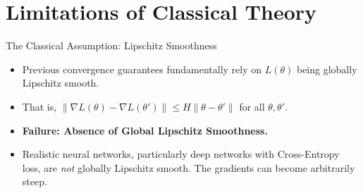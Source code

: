\documentclass[10pt, aspectratio=169]{beamer}
\theoremstyle{definition}
\begin{document}

\section{Limitations of Classical Theory}

\begin{frame}{The Classical Assumption: Lipschitz Smoothness}
    \begin{itemize}
        \item Previous convergence guarantees fundamentally rely on $L(\theta)$ being globally Lipschitz smooth.
        \item That is, $\|\nabla L(\theta) - \nabla L(\theta')\| \leq H \|\theta - \theta'\|$ for all $\theta, \theta'$.
        \item \textbf{Failure: Absence of Global Lipschitz Smoothness.}
        \item Realistic neural networks, particularly deep networks with Cross-Entropy loss, are \textit{not} globally Lipschitz smooth. The gradients can become arbitrarily steep.
    \end{itemize}
\end{frame}
\end{document}
